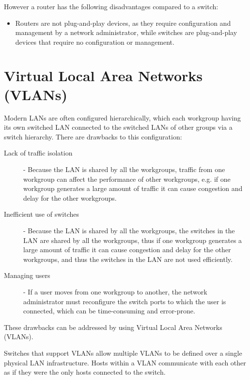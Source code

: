 \documentclass[12pt letter]{report}
\begin{document}
However a router has the following disadvantages compared to a switch:
\begin{itemize}
  \item Routers are not plug-and-play devices, as they require configuration and
    management by a network administrator, while switches are
    plug-and-play devices that require no configuration or management.
\end{itemize}

\section{Virtual Local Area Networks (VLANs)}

Modern LANs are often configured hierarchically, which each workgroup
having its own switched LAN connected to the switched LANs of other
groups via a switch hierarchy. There are drawbacks to this configuration:
\begin{description}
  \item[Lack of traffic isolation]  - Because the LAN is shared by
    all the workgroups, traffic from one
    workgroup can affect the performance of other workgroups, e.g. if
    one workgroup generates a large amount of traffic it can cause
    congestion and delay for the other workgroups.
  \item[Inefficient use of switches] - Because the LAN is shared by
    all the workgroups, the switches in the LAN are shared by all the
    workgroups, thus if one workgroup generates a large amount of
    traffic it can cause congestion and delay for the other
    workgroups, and thus the switches in the LAN are not used efficiently.
  \item[Managing users] - If a user moves from one workgroup to
    another, the network administrator must reconfigure the switch
    ports to which the user is connected, which can be time-consuming
    and error-prone.
\end{description}

These drawbacks can be addressed by using Virtual Local Area Networks (VLANs).


Switches that support VLANs allow multiple VLANs to be defined over a
single physical LAN infrastructure. Hosts within a VLAN communicate
with each other as if they were the only hosts connected to the switch.
\end{document}
